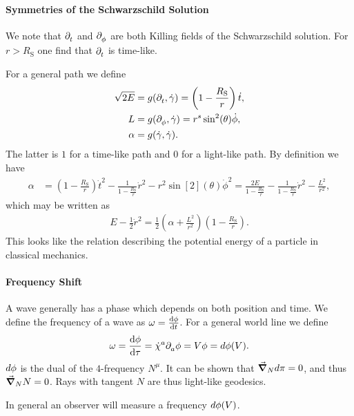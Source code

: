 \paragraph{Symmetries of the Schwarzschild Solution}
We note that $\partial^{}_{t}$ and $\partial^{}_{\phi}$ are both Killing fields of the Schwarzschild solution. For $r > R_{\text{S}}$ one find that $\partial^{}_{t}$ is time-like.

For a general path we define
\begin{align*}
	\sqrt{2E} &= g(\partial^{}_{t}, \dot{\gamma}) = \left(1 - \frac{R_{\text{S}}}{r}\right)\dot{t}, \\
	L         &= g(\partial^{}_{\phi}, \dot{\gamma}) = r^{s}\sin[2](\theta)\dot{\phi}, \\
	\alpha    &= g(\dot{\gamma}, \dot{\gamma}).
\end{align*}
The latter is $1$ for a time-like path and $0$ for a light-like path. By definition we have
\begin{align*}
	\alpha &= \left(1 - \frac{R_{\text{S}}}{r}\right)\dot{t}^{2} - \frac{1}{1 - \frac{R_{\text{S}}}{r}}\dot{r}^{2} - r^{2}\sin[2](\theta)\dot{\phi}^{2} = \frac{2E}{1 - \frac{R_{\text{S}}}{r}} - \frac{1}{1 - \frac{R_{\text{S}}}{r}}\dot{r}^{2} - \frac{L^{2}}{r^{2}},
\end{align*}
which may be written as
\begin{align*}
	E - \frac{1}{2}\dot{r}^{2} = \frac{1}{2}\left(\alpha + \frac{L^{2}}{r^{2}}\right)\left(1 - \frac{R_{\text{S}}}{r}\right).
\end{align*}
This looks like the relation describing the potential energy of a particle in classical mechanics.

\paragraph{Frequency Shift}
A wave generally has a phase which depends on both position and time. We define the frequency of a wave as $\omega = \dv{\phi}{t}$. For a general world line we define
\begin{align*}
	\omega = \dv{\phi}{\tau} = \dot{\chi}^{a}\partial^{}_{a}\phi = V\phi = d\phi(V).
\end{align*}
$d\phi$ is the dual of the $4$-frequency $N^{\mu}$. It can be shown that $\grad_{N}{d\pi} = 0$, and thus $\grad_{N}{N} = 0$. Rays with tangent $N$ are thus light-like geodesics.

In general an observer will measure a frequency $d\phi(V)$.

